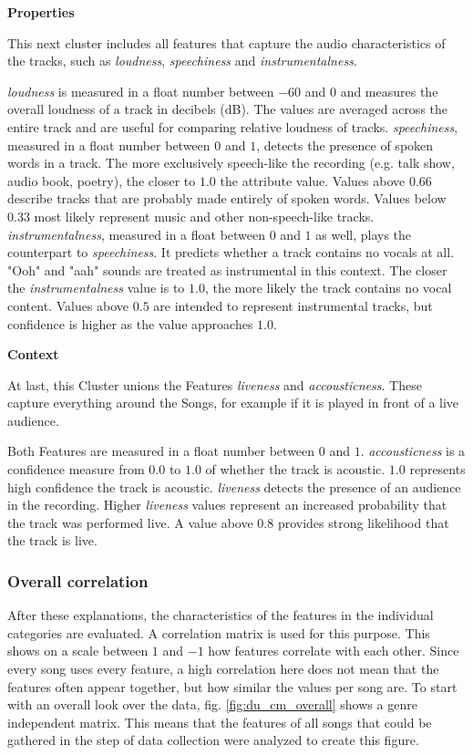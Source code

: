 \textbf{Properties}

This next cluster includes all features that capture the audio characteristics of the tracks,
such as \emph{loudness}, \emph{speechiness} and \emph{instrumentalness}.

\emph{loudness} is measured in a float number between \(-60\) and \(0\) and measures the overall loudness
of a track in decibels (dB). 
The values are averaged across the entire track and are useful for comparing relative
loudness of tracks. 
\emph{speechiness}, measured in a float number between \(0\) and \(1\), detects the presence of spoken words in a track. 
The more exclusively speech-like the recording (e.g. talk show, audio book, poetry),
the closer to \(1.0\) the attribute value. 
Values above \(0.66\) describe tracks that are probably made entirely of spoken words. Values below \(0.33\) most likely represent music and other non-speech-like tracks. 
\emph{instrumentalness}, measured in a float between \(0\) and \(1\) as well, plays the counterpart to \emph{speechiness}.
It predicts whether a track contains no vocals at all. "Ooh" and "aah" sounds are treated as instrumental in this context.
The closer the \emph{instrumentalness} value is to \(1.0\), the more likely the track contains no vocal content. 
Values above \(0.5\) are intended to represent instrumental tracks, but confidence is higher as the value approaches \(1.0\). \cite[]{Features}

\textbf{Context}

At last, this Cluster unions the Features \emph{liveness} and \emph{accousticness}.
These capture everything around the Songs, for example if it is played in front of a live audience.

Both Features are measured in a float number between \(0\) and \(1\).
\emph{accousticness} is a confidence measure from \(0.0\) to \(1.0\) of whether the track is acoustic. \(1.0\) represents high confidence the track is acoustic. 
\emph{liveness} detects the presence of an audience in the recording. 
Higher \emph{liveness} values represent an increased probability that the track was performed live.
A value above \(0.8\) provides strong likelihood that the track is live. 

\subsubsection{Overall correlation}
After these explanations, the characteristics of the features in the individual categories are evaluated.
A correlation matrix is used for this purpose. This shows on a scale between \(1\) and \(-1\) how
features correlate with each other. Since every song uses every feature,
a high correlation here does not mean that the features often appear together,
but how similar the values per song are. To start with an overall look over the data,
fig. \ref{fig:du_cm_overall}  shows a genre independent matrix.
This means that the features of all songs that could be gathered in the step of data
collection were analyzed to create this figure. \cite[]{Features}

